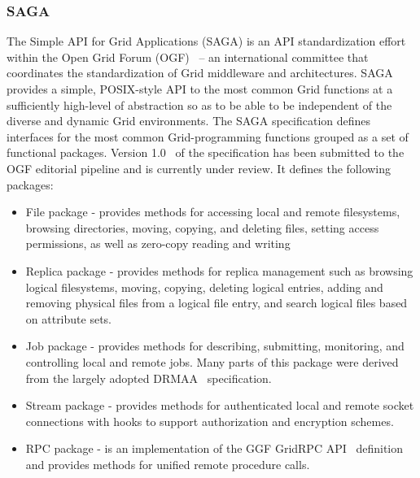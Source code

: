 \documentclass[conference,final]{IEEEtran}
\begin{document}

\subsubsection{SAGA}

The Simple API for Grid Applications (SAGA) is an API standardization
effort within the Open Grid Forum (OGF)~\cite{ogf_web} -- an
international committee that coordinates the standardization of Grid
middleware and architectures. SAGA provides a simple, POSIX-style API
to the most common Grid functions at a sufficiently high-level of
abstraction so as to be able to be independent of the diverse and
dynamic Grid environments.  The SAGA specification defines interfaces
for the most common Grid-programming functions grouped as a set of
functional packages.  Version 1.0~\cite{saga-core} of the
specification has been submitted to the OGF editorial pipeline and is
currently under review.  It defines the following packages:

\begin{itemize}
\item File package - provides methods for accessing local and remote
  filesystems, browsing directories, moving, copying, and deleting
  files, setting access permissions, as well as zero-copy reading and
  writing
\item Replica package - provides methods for replica management such
  as browsing logical filesystems, moving, copying, deleting logical
  entries, adding and removing physical files from a logical file
  entry, and search logical files based on attribute sets.
\item Job package - provides methods for describing, submitting,
  monitoring, and controlling local and remote jobs. Many parts of
  this package were derived from the largely adopted
  DRMAA~\cite{drmaa_url} specification.
\item Stream package - provides methods for authenticated local and
  remote socket connections with hooks to support authorization and
  encryption schemes.
\item RPC package - is an implementation of the GGF GridRPC
  API~\cite{gridrpc_url} definition and provides methods for unified
  remote procedure calls.
\end{itemize}
\end{document}
